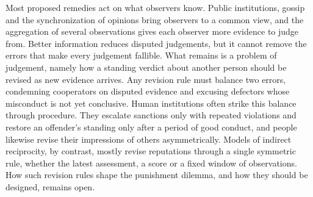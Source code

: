 Most proposed remedies act on what observers know. Public institutions, gossip and the synchronization of opinions bring observers to a common view\cite{radzvilavicius2021,kawakatsu2024,murase2024synchronization,tham2026}, and the aggregation of several observations gives each observer more evidence to judge from\cite{michelmata2024}. Better information reduces disputed judgements, but it cannot remove the errors that make every judgement fallible\cite{hilbe2018,murase2023}. What remains is a problem of judgement, namely how a standing verdict about another person should be revised as new evidence arrives. Any revision rule must balance two errors, condemning cooperators on disputed evidence and excusing defectors whose misconduct is not yet conclusive. Human institutions often strike this balance through procedure. They escalate sanctions only with repeated violations\cite{ostrom1990,cox2010} and restore an offender's standing only after a period of good conduct\cite{blumstein2009}, and people likewise revise their impressions of others asymmetrically\cite{skowronski1989,slovic1993,mendesiedlecki2013diagnostic,siegel2018}. Models of indirect reciprocity, by contrast, mostly revise reputations through a single symmetric rule, whether the latest assessment, a score or a fixed window of observations\cite{ohtsuki2004,hilbe2018,schmid2023,michelmata2024}. How such revision rules shape the punishment dilemma, and how they should be designed, remains open.
